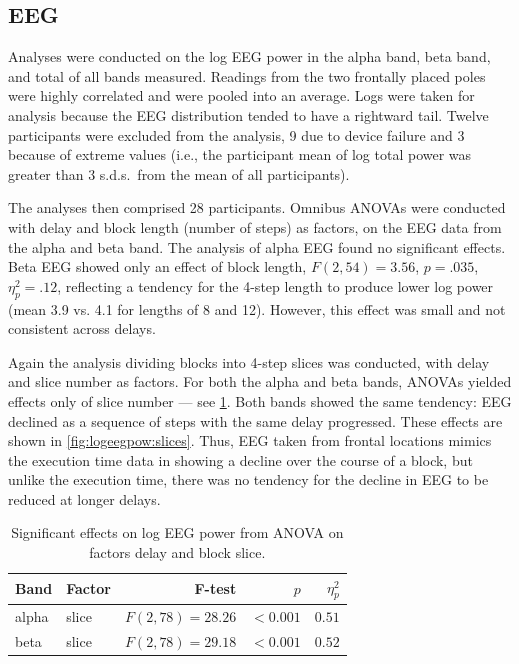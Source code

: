 \subsection{EEG}
Analyses were conducted on the log EEG power in the alpha band, beta band, and total of all bands measured.
Readings from the two frontally placed poles were highly correlated and were pooled into an average.
Logs were taken for analysis because the EEG distribution tended to have a rightward tail.
Twelve participants were excluded from the analysis, 9 due to device failure and 3 because of extreme values (i.e., the participant mean of log total power was greater than 3 s.d.s.\ from the mean of all participants).

The analyses then comprised 28 participants.\@
Omnibus ANOVAs were conducted with delay and block length (number of steps) as factors, on the EEG data from the alpha and beta band.
The analysis of alpha EEG found no significant effects.
Beta EEG showed only an effect of block length, \( F(2,54) = 3.56 \), \( p = .035 \), \( \eta^{2}_{p} = .12 \), reflecting a tendency for the 4-step length to produce lower log power (mean 3.9 vs. 4.1 for lengths of 8 and 12).
However, this effect was small and not consistent across delays.  

Again the analysis dividing blocks into 4-step slices was conducted, with delay and slice number as factors.  
For both the alpha and beta bands, ANOVAs  yielded effects only of slice number --- see \cref{tab:anova:egg:alphabeta}.
Both bands showed the same tendency:  EEG declined as a sequence of steps with the same delay progressed.
These effects are shown in \cref{fig:logeegpow:slices}.
Thus, EEG taken from frontal locations mimics the execution time data in showing a decline over the course of a block, but unlike the execution time, there was no tendency for the decline in EEG to be reduced at longer delays.

\begin{table}[h]
  \centering
  \caption{Significant effects on log EEG power from ANOVA on factors delay and block slice.}\label{tab:anova:egg:alphabeta}
  \setlength{\tabcolsep}{0pt} %
  \begin{tabular*}{\columnwidth}{@{\extracolsep{\fill}\quad}llrrr}
    \toprule
    \textbf{Band} & \textbf{Factor} & \textbf{F-test} & \textbf{\(p\)} & \textbf{\( \eta^{2}_{p} \)} \\ \midrule
    alpha   & slice & \( F(2, 78) = 28.26 \) & \( <0.001 \) & \( 0.51 \) \\ %
    beta    & slice & \( F(2, 78) = 29.18 \) & \( <0.001 \) & \( 0.52 \) \\ 
    \bottomrule
  \end{tabular*}
\end{table}

